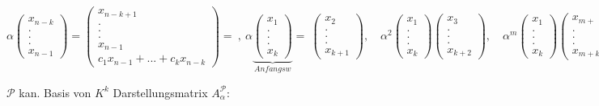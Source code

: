 $\alpha \begin{pmatrix}
x_{n-k}\\
.\\
.\\
.\\
x_{n-1}
\end{pmatrix}=
\begin{pmatrix}
x_{n-k+1}\\
.\\
.\\
.\\
x_{n-1}\\
c_1x_{n-1}+...+c_kx_{n-k}
\end{pmatrix}=
~,~
\alpha \underbrace{\begin{pmatrix}
	x_{1}\\
	.\\
	.\\
	.\\
	x_{k}
	\end{pmatrix}}_{Anfangsw}=~
\begin{pmatrix}
x_{2}\\
.\\
.\\
.\\
x_{k+1}
\end{pmatrix}, \quad
\alpha^2 \begin{pmatrix}
x_{1}\\
.\\
.\\
.\\
x_{k}
\end{pmatrix}
\begin{pmatrix}
x_{3}\\
.\\
.\\
.\\
x_{k+2}
\end{pmatrix}, \quad
\alpha^m \begin{pmatrix}
x_{1}\\
.\\
.\\
.\\
x_{k}
\end{pmatrix}
\begin{pmatrix}
x_{m+}\\
.\\
.\\
.\\
x_{m+k}
\end{pmatrix}
$

$\mathcal{P}$ kan. Basis von $K^k$ \qquad Darstellungsmatrix $A_{\alpha}^{\mathcal{P}}$:

